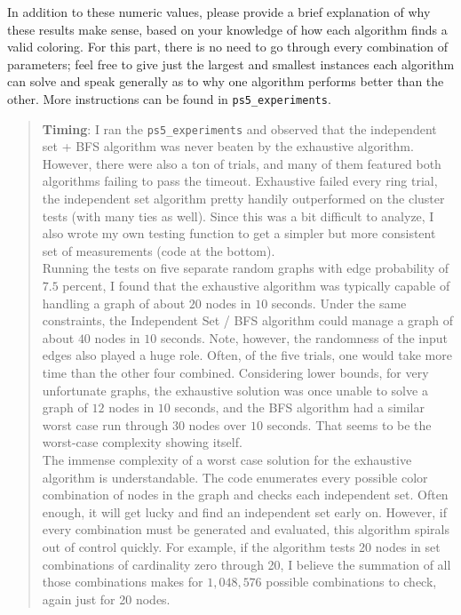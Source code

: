 \documentclass[11pt]{article}
\begin{document}
\begin{enumerate}
\begin{enumerate}
    In addition to these numeric values, please provide a brief explanation of why these results make sense, based on your knowledge of how each algorithm finds a valid coloring. For this part, there is no need to go through every combination of parameters; feel free to give just the largest and smallest instances each algorithm can solve and speak generally as to why one algorithm performs better than the other. More instructions can be found in \texttt{ps5\_experiments}.
  \begin{quote}
      \color{purple}
      \textbf{Timing}: \newline 
      I ran the \texttt{ps5\_experiments} and observed that the independent set + BFS algorithm was never beaten by the exhaustive algorithm. However, there were also a ton of trials, and many of them featured both algorithms failing to pass the timeout. Exhaustive failed every ring trial, the independent set algorithm pretty handily outperformed on the cluster tests (with many ties as well). Since this was a bit difficult to analyze, I also wrote my own testing function to get a simpler but more consistent set of measurements (code at the bottom). \\ 
      
      Running the tests on five separate random graphs with edge probability of $7.5$ percent, I found that the exhaustive algorithm was typically capable of handling a graph of about $20$ nodes in $10$ seconds. Under the same constraints, the Independent Set / BFS algorithm could manage a graph of about $40$ nodes in $10$ seconds. Note, however, the randomness of the input edges also played a huge role. Often, of the five trials, one would take more time than the other four combined. Considering lower bounds, for very unfortunate graphs, the exhaustive solution was once unable to solve a graph of $12$ nodes in $10$ seconds, and the BFS algorithm had a similar worst case run through $30$ nodes over $10$ seconds. That seems to be the worst-case complexity showing itself. \\

      The immense complexity of a worst case solution for the exhaustive algorithm is understandable. The code enumerates every possible color combination of nodes in the graph and checks each independent set. Often enough, it will get lucky and find an independent set early on. However, if every combination must be generated and evaluated, this algorithm spirals out of control quickly. For example, if the algorithm tests 20 nodes in set combinations of cardinality zero through 20, I believe the summation of all those combinations makes for $1,048,576$ possible combinations to check, again just for 20 nodes. \\


\end{quote}
\end{enumerate}
\end{enumerate}
\end{document}
